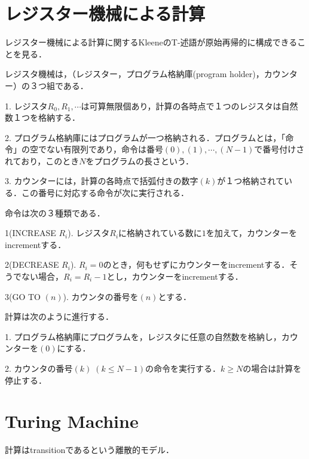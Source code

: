 \documentclass[uplatex, dvipdfmx]{jsreport}
\begin{document}
\section{レジスター機械による計算}
レジスター機械による計算に関するKleeneのT-述語が原始再帰的に構成できることを見る．
\begin{screen}
\begin{definition}[レジスタ機械]
    レジスタ機械は，（レジスター，プログラム格納庫(program holder)，カウンター）の３つ組である．

    1. レジスタ$R_0, R_1, \cdots$は可算無限個あり，計算の各時点で１つのレジスタは自然数１つを格納する．

    2. プログラム格納庫にはプログラムが一つ格納される．プログラムとは，「命令」の空でない有限列であり，命令は番号$(0),(1),\cdots, (N-1)$で番号付けされており，このとき$N$をプログラムの長さという．

    3. カウンターには，計算の各時点で括弧付きの数字$(k)$が１つ格納されている．この番号に対応する命令が次に実行される．
\end{definition}
\begin{definition}[命令]
    命令は次の３種類である．

    1(INCREASE $R_i$). レジスタ$R_i$に格納されている数に$1$を加えて，カウンターをincrementする．

    2(DECREASE $R_i$). $R_i=0$のとき，何もせずにカウンターをincrementする．そうでない場合，$R_i=R_i-1$とし，カウンターをincrementする．

    3(GO TO $(n)$). カウンタの番号を$(n)$とする．
\end{definition}

計算は次のように進行する．

1. プログラム格納庫にプログラムを，レジスタに任意の自然数を格納し，カウンターを$(0)$にする．

2. カウンタの番号$(k)\; (k\le N-1)$の命令を実行する．$k\ge N$の場合は計算を停止する．
\end{screen}

\begin{definition}[プログラムが計算する部分関数]
    
\end{definition}

\section{Turing Machine}
計算はtransitionであるという離散的モデル．
\end{document}
